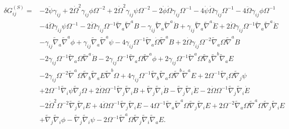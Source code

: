 \documentclass[10pt,letterpaper]{article}
\begin{document}
\begin{align}
\delta G_{ij}^{(S)}={}&-2 \ddot{\psi} \gamma_{ij}
 + 2 \dot{\Omega}^2 \gamma_{ij} \phi \Omega^{-2}
 + 2 \dot{\Omega}^2 \gamma_{ij} \psi \Omega^{-2}
 - 2 \dot{\phi} \dot{\Omega} \gamma_{ij} \Omega^{-1}
 - 4 \dot{\psi} \dot{\Omega} \gamma_{ij} \Omega^{-1}
 - 4 \ddot{\Omega} \gamma_{ij} \phi \Omega^{-1}\nonumber\\
& - 4 \ddot{\Omega} \gamma_{ij} \psi \Omega^{-1}
 - 2 \dot{\Omega} \gamma_{ij} \Omega^{-1} \tilde{\nabla}_{a}\tilde{\nabla}^{a}B
 -  \gamma_{ij} \tilde{\nabla}_{a}\tilde{\nabla}^{a}\dot{B}
 + \gamma_{ij} \tilde{\nabla}_{a}\tilde{\nabla}^{a}\ddot{E}
 + 2 \dot{\Omega} \gamma_{ij} \Omega^{-1} \tilde{\nabla}_{a}\tilde{\nabla}^{a}\dot{E}\nonumber\\
& -  \gamma_{ij} \tilde{\nabla}_{a}\tilde{\nabla}^{a}\phi
 + \gamma_{ij} \tilde{\nabla}_{a}\tilde{\nabla}^{a}\psi
 - 4 \gamma_{ij} \Omega^{-1} \tilde{\nabla}_{a}\dot{\Omega} \tilde{\nabla}^{a}B
 + 2 \dot{\Omega} \gamma_{ij} \Omega^{-2} \tilde{\nabla}_{a}\Omega \tilde{\nabla}^{a}B\nonumber\\
& - 2 \gamma_{ij} \Omega^{-1} \tilde{\nabla}_{a}\Omega \tilde{\nabla}^{a}\dot{B}
 - 2 \gamma_{ij} \Omega^{-1} \tilde{\nabla}_{a}\Omega \tilde{\nabla}^{a}\phi
 + 2 \gamma_{ij} \Omega^{-1} \tilde{\nabla}^{a}\Omega \tilde{\nabla}_{b}\tilde{\nabla}^{b}\tilde{\nabla}_{a}E\nonumber\\
& - 2 \gamma_{ij} \Omega^{-2} \tilde{\nabla}^{a}\Omega \tilde{\nabla}_{b}\tilde{\nabla}_{a}E \tilde{\nabla}^{b}\Omega
 + 4 \gamma_{ij} \Omega^{-1} \tilde{\nabla}_{b}\tilde{\nabla}_{a}\Omega \tilde{\nabla}^{b}\tilde{\nabla}^{a}E
 + 2 \Omega^{-1} \tilde{\nabla}_{i}\Omega \tilde{\nabla}_{j}\psi\nonumber\\
& + 2 \Omega^{-1} \tilde{\nabla}_{i}\psi \tilde{\nabla}_{j}\Omega
 + 2 \dot{\Omega} \Omega^{-1} \tilde{\nabla}_{j}\tilde{\nabla}_{i}B
 + \tilde{\nabla}_{j}\tilde{\nabla}_{i}\dot{B}
 -  \tilde{\nabla}_{j}\tilde{\nabla}_{i}\ddot{E}
 - 2 \dot{\Omega} \Omega^{-1} \tilde{\nabla}_{j}\tilde{\nabla}_{i}\dot{E}\nonumber\\
& - 2 \dot{\Omega}^2 \Omega^{-2} \tilde{\nabla}_{j}\tilde{\nabla}_{i}E
 + 4 \ddot{\Omega} \Omega^{-1} \tilde{\nabla}_{j}\tilde{\nabla}_{i}E
 - 4 \Omega^{-1} \tilde{\nabla}_{a}\tilde{\nabla}^{a}\Omega \tilde{\nabla}_{j}\tilde{\nabla}_{i}E
 + 2 \Omega^{-2} \tilde{\nabla}_{a}\Omega \tilde{\nabla}^{a}\Omega \tilde{\nabla}_{j}\tilde{\nabla}_{i}E\nonumber\\
& + \tilde{\nabla}_{j}\tilde{\nabla}_{i}\phi
 -  \tilde{\nabla}_{j}\tilde{\nabla}_{i}\psi
 - 2 \Omega^{-1} \tilde{\nabla}^{a}\Omega \tilde{\nabla}_{j}\tilde{\nabla}_{i}\tilde{\nabla}_{a}E.
\end{align}
\end{document}
